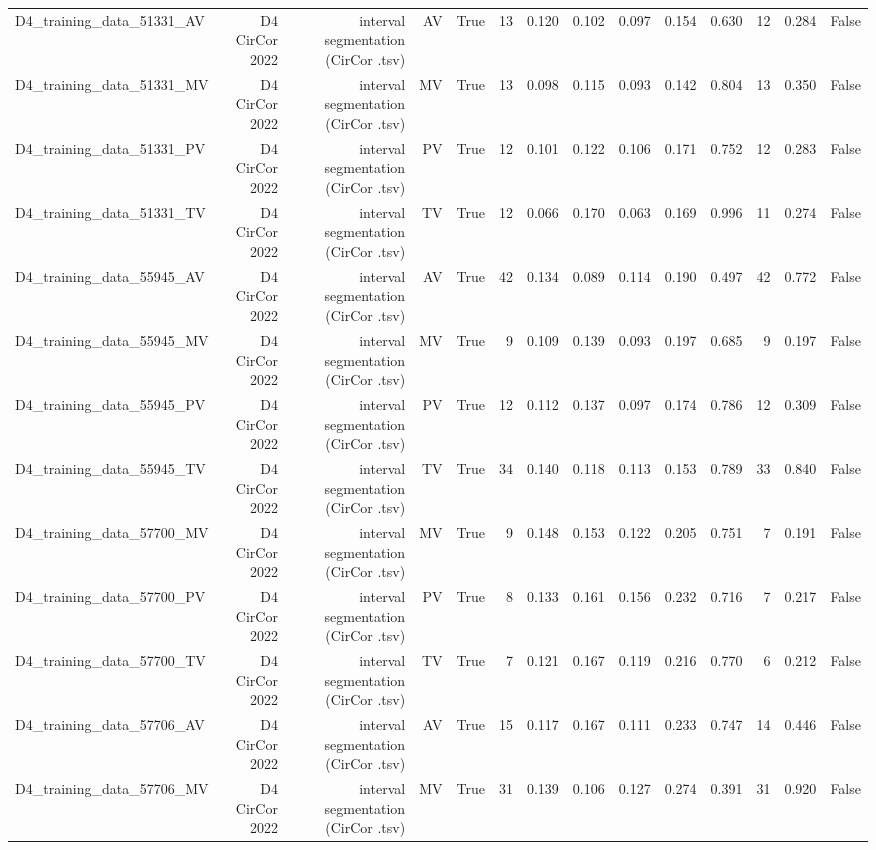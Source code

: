 \begin{table}[htbp]
\begin{tabular}{lrrrrrrrrrrrrr}
    D4\_training\_data\_51331\_AV & D4 CirCor 2022 & interval segmentation (CirCor .tsv) & AV & True & 13 & 0.120 & 0.102 & 0.097 & 0.154 & 0.630 & 12 & 0.284 & False \\
    D4\_training\_data\_51331\_MV & D4 CirCor 2022 & interval segmentation (CirCor .tsv) & MV & True & 13 & 0.098 & 0.115 & 0.093 & 0.142 & 0.804 & 13 & 0.350 & False \\
    D4\_training\_data\_51331\_PV & D4 CirCor 2022 & interval segmentation (CirCor .tsv) & PV & True & 12 & 0.101 & 0.122 & 0.106 & 0.171 & 0.752 & 12 & 0.283 & False \\
    D4\_training\_data\_51331\_TV & D4 CirCor 2022 & interval segmentation (CirCor .tsv) & TV & True & 12 & 0.066 & 0.170 & 0.063 & 0.169 & 0.996 & 11 & 0.274 & False \\
    D4\_training\_data\_55945\_AV & D4 CirCor 2022 & interval segmentation (CirCor .tsv) & AV & True & 42 & 0.134 & 0.089 & 0.114 & 0.190 & 0.497 & 42 & 0.772 & False \\
    D4\_training\_data\_55945\_MV & D4 CirCor 2022 & interval segmentation (CirCor .tsv) & MV & True & 9 & 0.109 & 0.139 & 0.093 & 0.197 & 0.685 & 9 & 0.197 & False \\
    D4\_training\_data\_55945\_PV & D4 CirCor 2022 & interval segmentation (CirCor .tsv) & PV & True & 12 & 0.112 & 0.137 & 0.097 & 0.174 & 0.786 & 12 & 0.309 & False \\
    D4\_training\_data\_55945\_TV & D4 CirCor 2022 & interval segmentation (CirCor .tsv) & TV & True & 34 & 0.140 & 0.118 & 0.113 & 0.153 & 0.789 & 33 & 0.840 & False \\
    D4\_training\_data\_57700\_MV & D4 CirCor 2022 & interval segmentation (CirCor .tsv) & MV & True & 9 & 0.148 & 0.153 & 0.122 & 0.205 & 0.751 & 7 & 0.191 & False \\
    D4\_training\_data\_57700\_PV & D4 CirCor 2022 & interval segmentation (CirCor .tsv) & PV & True & 8 & 0.133 & 0.161 & 0.156 & 0.232 & 0.716 & 7 & 0.217 & False \\
    D4\_training\_data\_57700\_TV & D4 CirCor 2022 & interval segmentation (CirCor .tsv) & TV & True & 7 & 0.121 & 0.167 & 0.119 & 0.216 & 0.770 & 6 & 0.212 & False \\
    D4\_training\_data\_57706\_AV & D4 CirCor 2022 & interval segmentation (CirCor .tsv) & AV & True & 15 & 0.117 & 0.167 & 0.111 & 0.233 & 0.747 & 14 & 0.446 & False \\
    D4\_training\_data\_57706\_MV & D4 CirCor 2022 & interval segmentation (CirCor .tsv) & MV & True & 31 & 0.139 & 0.106 & 0.127 & 0.274 & 0.391 & 31 & 0.920 & False \\

\end{tabular}
\end{table}

